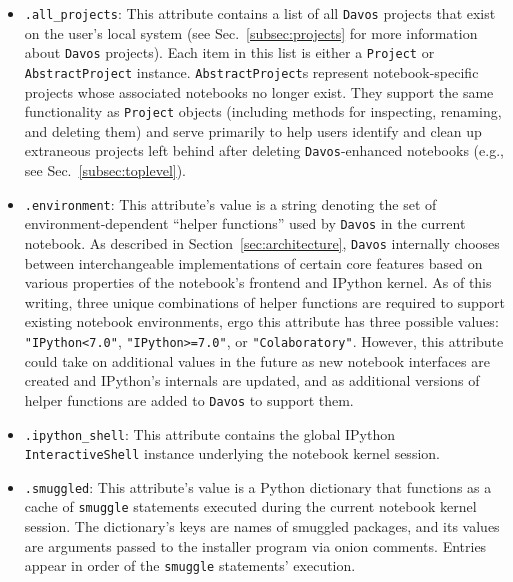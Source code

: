 \documentclass[preprint,12pt,a4paper]{elsarticle}
\begin{document}
\begin{itemize}

\item \texttt{.all\_projects}: This attribute contains a list of all \texttt{Davos} projects that exist on the user's local system (see Sec.~\ref{subsec:projects} for more information about \texttt{Davos} projects).
  Each item in this list is either a \texttt{Project} or \texttt{AbstractProject} instance.
  \texttt{Abstract\-Project}s represent notebook-specific projects whose associated notebooks no longer exist.
  They support the same functionality as \texttt{Project} objects (including methods for inspecting, renaming, and deleting them) and serve primarily to help users identify and clean up extraneous projects left behind after deleting \texttt{Davos}-enhanced notebooks (e.g., see Sec.~\ref{subsec:toplevel}).

\item \texttt{.environment}: This attribute's value is a string denoting the set of environment-dependent ``helper functions'' used by \texttt{Davos} in the current notebook.
  As described in Section~\ref{sec:architecture}, \texttt{Davos} internally chooses between interchangeable implementations of certain core features based on various properties of the notebook's frontend and IPython kernel.
  As of this writing, three unique combinations of helper functions are required to support existing notebook environments, ergo this attribute has three possible values: \texttt{"IPython<7.0"}, \texttt{"IPython>=7.0"}, or \texttt{"Colaboratory"}.
  However, this attribute could take on additional values in the future as new notebook interfaces are created and IPython's internals are updated, and as additional versions of helper functions are added to \texttt{Davos} to support them.

\item \texttt{.ipython\_shell}: This attribute contains the global IPython \texttt{InteractiveShell} instance underlying the notebook kernel session.

\item \texttt{.smuggled}: This attribute's value is a Python dictionary that functions as a cache of \texttt{smuggle} statements executed during the current notebook kernel session.
  The dictionary's keys are names of smuggled packages, and its values are arguments passed to the installer program via onion comments.
  Entries appear in order of the \texttt{smuggle} statements' execution.

\end{itemize}
\end{document}
